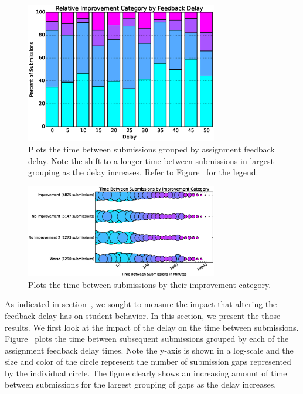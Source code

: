 \begin{figure}[!t]
\centering \includegraphics[width=3.3in]{graphs/Relative_Improvement_Category_by_Feedback_Delay.eps}
\caption{Plots the time between submissions grouped by assignment feedback
  delay. Note the shift to a longer time between submissions in largest
  grouping as the delay increases. Refer to
  Figure~ for the legend.}
\end{figure}

\begin{figure}[!t]
\centering \includegraphics[width=3.3in]{graphs/Time_Between_Submissions_by_Improvement_Category.eps}
\caption{Plots the time between submissions by their improvement category.}
\end{figure}

As indicated in section~, we sought to measure the impact
that altering the feedback delay has on student behavior. In this section, we
present the those results. We first look at the impact of the delay on the time
between submissions. Figure~ plots the time between
subsequent submissions grouped by each of the assignment feedback delay
times. Note the y-axis is shown in a log-scale and the size and color of the
circle represent the number of submission gaps represented by the individual
circle. The figure clearly shows an increasing amount of time between
submissions for the largest grouping of gaps as the delay increases.

